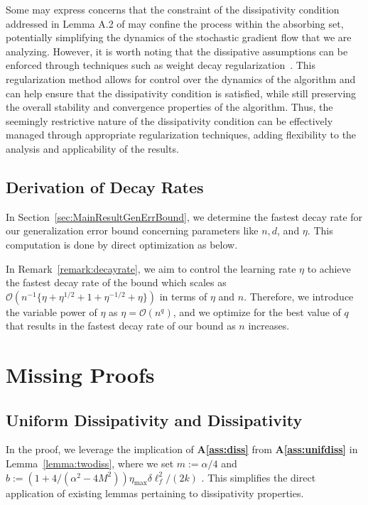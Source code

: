 \documentclass{article}
\begin{document}
Some may express concerns that the constraint of the dissipativity condition addressed in Lemma A.2 of \citet{Farghly} may confine the process within the absorbing set, potentially simplifying the dynamics of the stochastic gradient flow that we are analyzing. However, it is worth noting that the dissipative assumptions can be enforced through techniques such as weight decay regularization~\citep{Krogh, Raginsky}. This regularization method allows for control over the dynamics of the algorithm and can help ensure that the dissipativity condition is satisfied, while still preserving the overall stability and convergence properties of the algorithm. Thus, the seemingly restrictive nature of the dissipativity condition can be effectively managed through appropriate regularization techniques, adding flexibility to the analysis and applicability of the results.

\subsection{Derivation of Decay Rates}\label{appendix:decayrate}
In Section~\ref{sec:MainResultGenErrBound}, we determine the fastest decay rate for our generalization error bound concerning parameters like $n, d$, and $\eta$. This computation is done by direct optimization as below.

In Remark~\ref{remark:decayrate}, we aim to control the learning rate $\eta$ to achieve the fastest decay rate of the bound which scales as $\mathcal{O}(n^{-1} \{\eta + \eta^{1/2} + 1 + \eta^{-1/2} + \eta\})$ in terms of $\eta$ and $n$. Therefore, we introduce the variable power of $\eta$ as $\eta = \mathcal{O}(n^q)$, and we optimize for the best value of $q$ that results in the fastest decay rate of our bound as $n$ increases.

\section{Missing Proofs}\label{appendix:lemmaproofs}\label{appendixA}


\subsection{Uniform Dissipativity and Dissipativity}\label{appendix:unifdiss-diss}

In the proof, we leverage the implication of \textbf{A\ref{ass:diss}} from \textbf{A\ref{ass:unifdiss}} in Lemma~\ref{lemma:twodiss}, where we set $m := \alpha/4$ and $b := \left(1 + 4/(\alpha^2 - 4M^2) \right) \eta_{\max} \delta \ell_f^2 /(2k)$ . This simplifies the direct application of existing lemmas pertaining to dissipativity properties.
\end{document}
